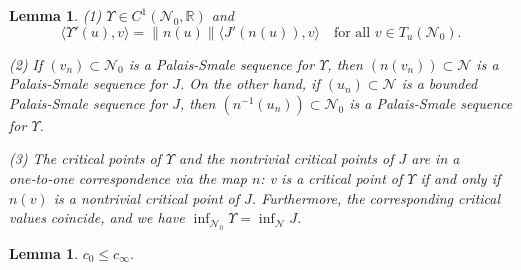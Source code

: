 \documentclass[10pt,a4paper]{amsart}
\numberwithin{equation}{section}
\newtheorem{lemma}[theorem]{Lemma}
\begin{document}
\begin{lemma}\label{L3.10} 
(1) $\Upsilon\in C^{1}(\mathcal{N}_0,\mathbb{R})$ and
$$
\langle \Upsilon'(u),v \rangle =\|n(u)\| \langle J'(n(u)),v \rangle \quad \text{for all } v\in T_{u}(\mathcal{N}_0).
$$

(2) If $(v_{n})\subset\mathcal{N}_0$ is a Palais-Smale sequence for $\Upsilon$,
 then $(n(v_{n}))\subset\mathcal{N}$ is a Palais-Smale sequence for $J$. 
On the other hand, if $(u_{n})\subset\mathcal{N}$ is a bounded Palais-Smale sequence for $J$, 
then $(n^{-1}(u_{n}))\subset\mathcal{N}_0$ is a Palais-Smale sequence for $\Upsilon$.

(3) The critical points of $\Upsilon$ and the nontrivial critical points of $J$ are in a one‑to‑one 
correspondence via the map $n$: v is a critical point of $\Upsilon$ if and only if $n(v)$ is a 
nontrivial critical point of $J$. Furthermore, the corresponding critical values coincide, and we
 have $\inf_{\mathcal{N}_0}\Upsilon=\inf_{\mathcal{N}}J$.
\end{lemma}

\begin{lemma}\label{L3.11} 
$c_0\leq c_\infty$.
\end{lemma}
\end{document}
